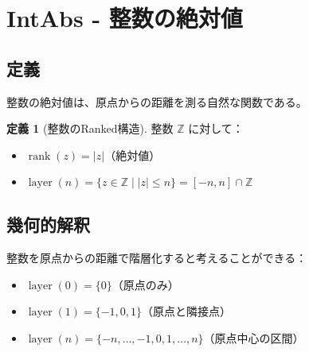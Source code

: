 \documentclass[a4paper,11pt]{ltjsarticle}
\theoremstyle{definition}
\newtheorem{definition}{定義}[section]
\newcommand{\rank}{\operatorname{rank}}
\newcommand{\layer}{\operatorname{layer}}
\begin{document}
\section{IntAbs - 整数の絶対値}
\label{sec:intabs}

\subsection{定義}

整数の絶対値は、原点からの距離を測る自然な関数である。

\begin{definition}[整数のRanked構造]
\label{def:int-ranked}
整数 $\mathbb{Z}$ に対して：
\begin{itemize}
\item $\rank(z) = |z|$（絶対値）
\item $\layer(n) = \{ z \in \mathbb{Z} \mid |z| \leq n \} = [-n, n] \cap \mathbb{Z}$
\end{itemize}
\end{definition}

\subsection{幾何的解釈}

整数を原点からの距離で階層化すると考えることができる：

\begin{itemize}
\item $\layer(0) = \{0\}$（原点のみ）
\item $\layer(1) = \{-1, 0, 1\}$（原点と隣接点）
\item $\layer(n) = \{-n, \ldots, -1, 0, 1, \ldots, n\}$（原点中心の区間）
\end{itemize}
\end{document}
